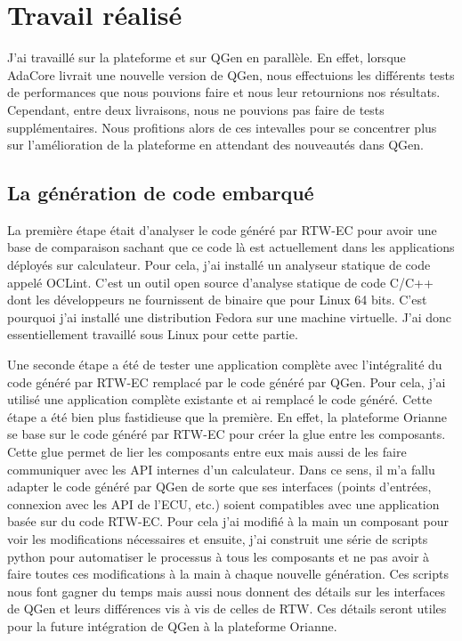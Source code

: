 \chapter{Travail réalisé}
J'ai travaillé sur la plateforme et sur QGen en parallèle.
En effet, lorsque AdaCore livrait une nouvelle version de QGen, nous effectuions
les différents tests de performances que nous pouvions faire et nous leur
retournions nos résultats. Cependant, entre deux livraisons, nous ne pouvions pas
faire de tests supplémentaires. Nous profitions alors de ces intevalles pour se
concentrer plus sur l'amélioration de la plateforme en attendant des nouveautés
dans QGen.

\section{La génération de code embarqué}
La première étape était d'analyser le code généré par RTW-EC\up{\circledR} pour
avoir une base de comparaison sachant que ce code là est actuellement dans les
applications déployés sur calculateur.
Pour cela, j'ai installé un analyseur statique de code appelé OCLint. C'est un
outil open source d'analyse statique de code C/C++ dont les développeurs ne
fournissent de binaire que
pour Linux 64 bits. C'est pourquoi j'ai installé une distribution Fedora sur une machine
virtuelle. J'ai donc essentiellement travaillé sous Linux pour cette partie.

Une seconde étape a été de tester une application complète avec l'intégralité du
code généré par RTW-EC\up{\circledR} remplacé par le code généré par QGen. Pour
cela, j'ai utilisé une application complète existante et ai remplacé le code
généré. Cette étape a été bien plus fastidieuse que la première. En effet, la
plateforme Orianne se base sur le code généré par RTW-EC\up{\circledR} pour
créer la \og glue \fg{} entre les composants. Cette glue permet de lier les
composants entre eux mais aussi de les faire communiquer avec les API internes d'un
calculateur. Dans ce sens, il m'a fallu adapter
le code généré par QGen de sorte que ses interfaces (points d'entrées, connexion
avec les API de l'ECU, etc.) soient compatibles avec une application basée sur du
code RTW-EC\up{\circledR}. Pour cela j'ai modifié à la main un composant pour
voir les modifications nécessaires et ensuite, j'ai construit une série de
scripts python pour automatiser le processus à tous les composants et ne pas
avoir à faire toutes ces modifications à la main à chaque nouvelle génération.
Ces scripts nous font gagner du temps mais aussi nous donnent des détails sur les
interfaces de QGen et leurs différences vis à vis de celles de RTW. Ces détails
seront utiles pour la future intégration de QGen à la plateforme Orianne.

